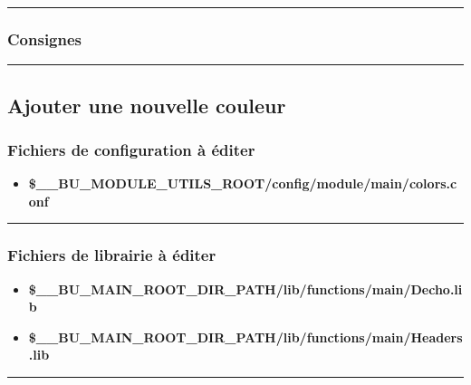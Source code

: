 \documentclass[a4paper,10pt]{article}
\begin{document}

\color{blue}\par\noindent\rule{\textwidth}{0.4pt}\color{white}

\color{blue}
\subsubsection{Consignes}\color{white}



\color{green}\par\noindent\rule{\textwidth}{0.4pt}\color{white}

\color{green}
\subsection{Ajouter une nouvelle couleur}\color{white}

\color{blue}
\subsubsection{Fichiers de configuration à éditer}\color{white}
\begin{itemize}
    \item \textbf{\color{orange}\$\_\_BU\_MODULE\_UTILS\_ROOT\color{lime}/config/module/main/colors.conf}
\end{itemize}



\color{blue}\par\noindent\rule{\textwidth}{0.4pt}\color{white}

\color{blue}
\subsubsection{Fichiers de librairie à éditer}\color{white}
\begin{itemize}
    \item \textbf{\color{orange}\$\_\_BU\_MAIN\_ROOT\_DIR\_PATH\color{lime}/lib/functions/main/Decho.lib}
    \item \textbf{\color{orange}\$\_\_BU\_MAIN\_ROOT\_DIR\_PATH\color{lime}/lib/functions/main/Headers.lib}
\end{itemize}



\color{blue}\par\noindent\rule{\textwidth}{0.4pt}\color{white}
\end{document}

